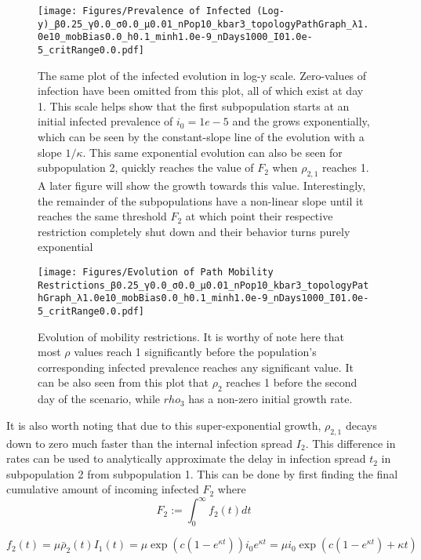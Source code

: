 \begin{figure}[!ht]
    \centering
    \texttt{[image: Figures/Prevalence of Infected (Log-y)\_β0.25\_γ0.0\_σ0.0\_μ0.01\_nPop10\_kbar3\_topologyPathGraph\_λ1.0e10\_mobBias0.0\_h0.1\_minh1.0e-9\_nDays1000\_I01.0e-5\_critRange0.0.pdf]}
    \caption{\small The same plot of the infected evolution in log-y scale. 
    Zero-values of infection have been omitted from this plot, all of which exist at day 1. 
    This scale helps show that the first subpopulation starts at an initial infected prevalence of 
    $i_0=1e-5$ and the grows exponentially, which can be seen by the constant-slope line of the evolution with a slope $1/\kappa$. This same exponential evolution can also be seen for subpopulation 2, quickly reaches the value of $F_2$ when $\rho_{2,1}$ reaches 1. A later figure will show the growth towards this value. Interestingly, the remainder of the subpopulations have a non-linear slope until it reaches the same threshold $F_2$ at which point their respective restriction completely shut down and their behavior turns purely exponential}
\end{figure}

\begin{figure}[!ht]
    \centering
    \texttt{[image: Figures/Evolution of Path Mobility Restrictions\_β0.25\_γ0.0\_σ0.0\_μ0.01\_nPop10\_kbar3\_topologyPathGraph\_λ1.0e10\_mobBias0.0\_h0.1\_minh1.0e-9\_nDays1000\_I01.0e-5\_critRange0.0.pdf]}
    \caption{\small Evolution of mobility restrictions. It is worthy of note here that most $\rho$ values reach 1 significantly before the population's corresponding infected prevalence reaches any significant value. It can be also seen from this plot that $\rho_2$ reaches 1 before the second day of the scenario, while $rho_3$ has a non-zero initial growth rate.}
\end{figure}

It is also worth noting that due to this super-exponential growth, $\rho_{2,1}$ decays down to zero much faster than the internal infection spread $I_2$. This difference in rates can be used to analytically approximate the delay in infection spread $t_2$ in subpopulation 2 from subpopulation 1. This can be done by first finding the final cumulative amount of incoming infected $F_2$ where 
\begin{equation}F_2:=\int_0^\infty f_2(t)dt\end{equation}
 

\begin{equation}f_2(t)=\mu \bar \rho_2(t) I_1(t) = \mu \exp\left({c \left( 1 - e^{\kappa t} \right)}\right)i_0 e^{\kappa t} = \mu i_0 \exp\left({c \left( 1 - e^{\kappa t} \right)} +\kappa t\right)\end{equation}

